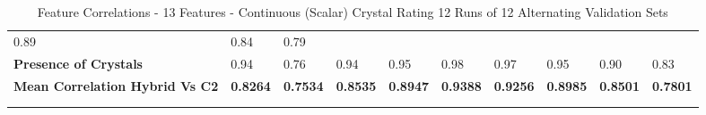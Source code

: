 \begin{longtable}[c]{@{}llllllllll@{}}
  \cellcolor[HTML]{FFF2CC}0.89 &
  \cellcolor[HTML]{DDEBF7}0.84 &
  \cellcolor[HTML]{D6DCE4}0.79 \\
\textbf{Presence of Crystals} &
  \cellcolor[HTML]{F8CBAD}0.94 &
  \cellcolor[HTML]{C6E0B4}0.76 &
  \cellcolor[HTML]{FFE699}0.94 &
  \cellcolor[HTML]{B4C6E7}0.95 &
  \cellcolor[HTML]{FCE4D6}0.98 &
  \cellcolor[HTML]{E2EFDA}0.97 &
  \cellcolor[HTML]{FFF2CC}0.95 &
  \cellcolor[HTML]{DDEBF7}0.90 &
  \cellcolor[HTML]{D6DCE4}0.83 \\
\cellcolor[HTML]{FFFF00}\textbf{Mean   Correlation Hybrid Vs C2} &
  \textbf{0.8264} &
  \textbf{0.7534} &
  \textbf{0.8535} &
  \cellcolor[HTML]{FFD966}\textbf{0.8947} &
  \cellcolor[HTML]{FFFF00}\textbf{0.9388} &
  \cellcolor[HTML]{FFD966}\textbf{0.9256} &
  \cellcolor[HTML]{FFD966}\textbf{0.8985} &
  \textbf{0.8501} &
  \textbf{0.7801} \\* \bottomrule
  \\
\caption{Feature Correlations - 13 Features - Continuous (Scalar) Crystal Rating 12 Runs of 12 Alternating Validation Sets}
\label{Feature Correlations - 13 Features - Continuous (Scalar) Crystal Rating 12 Runs of 12 Alternating Validation Sets}\\
\end{longtable}


